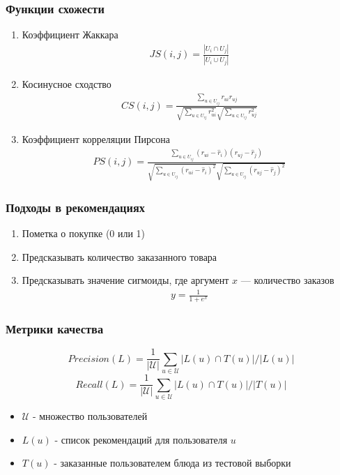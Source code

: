 \documentclass[10pt, unicode]{beamer}
\begin{document}
\begin{frame}
  \frametitle{Функции схожести}
  \begin{enumerate}
    \item Коэффициент Жаккара
    \begin{align*}
      JS(i,j) = \frac{|U_i \cap U_j|}{|U_i \cup U_j|}
    \end{align*}
    \item Косинусное сходство
    \begin{align*}
      CS(i,j) = \frac{\sum_{u \in U_{ij}} r_{ui}r_{uj}}{\sqrt{\sum_{u \in U_{ij}} r_{ui}^2}\sqrt{\sum_{u \in U_{ij}} r_{uj}^2}}
    \end{align*}
    \item Коэффициент корреляции Пирсона
    \begin{align*}
      PS(i,j) = \frac
        {\sum_{u \in U_{ij}} (r_{ui} - \hat{r}_i)(r_{uj} - \hat{r}_j)}
        {\sqrt{\sum_{u \in U_{ij}} (r_{ui} - \hat{r}_i)^2}\sqrt{\sum_{u \in U_{ij}} (r_{uj} - \hat{r}_j)^2}}
    \end{align*}
  \end{enumerate}
\end{frame}

\begin{frame}
  \frametitle{Подходы в рекомендациях}
  \begin{enumerate}
    \item Пометка о покупке (0 или 1)
    \item Предсказывать количество заказанного товара
    \item Предсказывать значение сигмоиды, где аргумент $x$ --- количество заказов
    \begin{align*}
      y = \frac{1}{1 + e^x}
    \end{align*}
  \end{enumerate}
\end{frame}

\begin{frame}
  \frametitle{Метрики качества}
  \begin{equation}
    Precision(L) = \frac{1}{|\mathcal{U}|} \sum_{u \in \mathcal{U}} |L(u) \cap T(u)| / |L(u)|
  \end{equation}
  \begin{equation}
    Recall(L) = \frac{1}{|\mathcal{U}|} \sum_{u \in \mathcal{U}} |L(u) \cap T(u)| / |T(u)|
  \end{equation}
  \begin{itemize}
    \item $\mathcal{U}$ - множество пользователей
    \item $L(u)$ - список рекомендаций для пользователя $u$
    \item $T(u)$ - заказанные пользователем блюда из тестовой выборки
  \end{itemize}
\end{frame}
\end{document}

